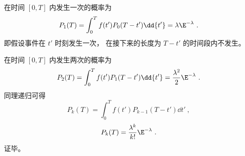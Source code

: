 在时间 $[0,T]$ 内发生一次的概率为
\begin{equation}
P_1(T) = \int_{0}^{T} f(t') P_0(T-t')\dd{t'} = \lambda \E^{-\lambda}~.
\end{equation}
即假设事件在 $t'$ 时刻发生一次， 在接下来的长度为 $T-t'$ 的时间段内不发生。

在时间 $[0,T]$ 内发生两次的概率为
\begin{equation}
P_2(T) = \int_{0}^{T} f(t') P_1(T-t')\dd{t'} = \frac{\lambda^2}{2}\E^{-\lambda}~.
\end{equation}
同理递归可得
\begin{equation}
P_{k}(T) = \int_{0}^{T} f(t') P_{k-1}(T-t')\dd{t'}~,
\end{equation}
\begin{equation}
P_k(T) = \frac{\lambda^k}{k!}\E^{-\lambda}~.
\end{equation}
证毕。
